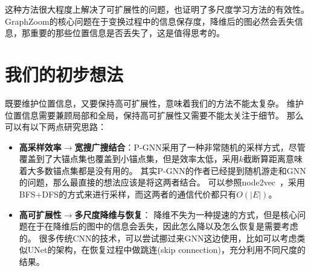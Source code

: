 \documentclass[reportComp]{thesis}
\begin{document}
这种方法很大程度上解决了可扩展性的问题，也证明了多尺度学习方法的有效性。
GraphZoom的核心问题在于变换过程中的信息保存度，降维后的图必然会丢失信息，那重要的那些位置信息是否丢失了，这是值得思考的。

\section{我们的初步想法}
既要维护位置信息，又要保持高可扩展性，意味着我们的方法不能太复杂。
维护位置信息需要兼顾局部和全局，保持高可扩展性又需要不能太关注于细节。
那么可以有以下两点研究思路：
\begin{itemize}
\item \textbf{高采样效率$\to$宽搜广搜结合}：P-GNN采用了一种非常随机的采样方式，尽管覆盖到了大锚点集也覆盖到小锚点集，但是效率太低，采用$k$截断算距离意味着大多数锚点集都是没有用的。
其实P-GNN的作者已经提到随机游走和GNN的问题，那么最直接的想法应该是将这两者结合。
可以参照node2vec~\cite{grover:node2vec_kdd_2016}，采用BFS+DFS的方式来进行采样，而这两者的通信代价都只有$O(|E|)$。
\item \textbf{高可扩展性$\to$多尺度降维与恢复}：
降维不失为一种提速的方式，但是核心问题在于在降维后的图中的信息会丢失，因此怎么降以及怎么恢复是需要考虑的。
很多传统CNN的技术，可以尝试挪过来GNN这边使用，比如可以考虑类似UNet的架构，在恢复过程中做跳连(skip connection)，充分利用不同尺度的结果。
\end{itemize}



\end{document}
